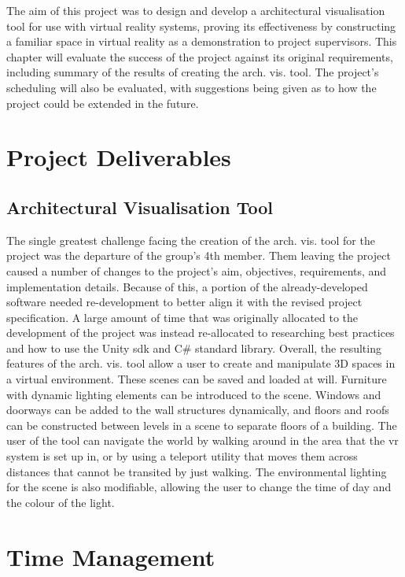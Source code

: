 The aim of this project was to design and develop a architectural visualisation tool for use with virtual reality systems, proving its effectiveness by constructing a familiar space in virtual reality as a demonstration to project supervisors. This chapter will evaluate the success of the project against its original requirements, including summary of the results of creating the arch. vis. tool. The project's scheduling will also be evaluated, with suggestions being given as to how the project could be extended in the future.

\section{Project Deliverables}

    \subsection{Architectural Visualisation Tool}
    
        The single greatest challenge facing the creation of the arch. vis. tool for the project was the departure of the group's 4th member. Them leaving the project caused a number of changes to the project's aim, objectives, requirements, and implementation details. Because of this, a portion of the already-developed software needed re-development to better align it with the revised project specification. A large amount of time that was originally allocated to the development of the project was instead re-allocated to researching best practices and how to use the Unity \acrshort{sdk} and C\# standard library. Overall, the resulting features of the arch. vis. tool allow a user to create and manipulate 3D spaces in a virtual environment. These scenes can be saved and loaded at will. Furniture with dynamic lighting elements can be introduced to the scene. Windows and doorways can be added to the wall structures dynamically, and floors and roofs can be constructed between levels in a scene to separate floors of a building. The user of the tool can navigate the world by walking around in the area that the \acrshort{vr} system is set up in, or by using a teleport utility that moves them across distances that cannot be transited by just walking. The environmental lighting for the scene is also modifiable, allowing the user to change the time of day and the colour of the light.
    
\section{Time Management}

